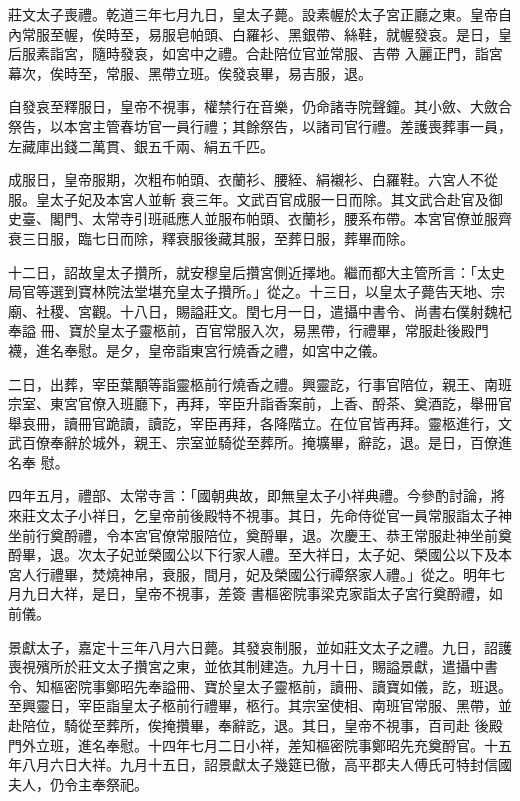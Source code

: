 \begin{pinyinscope}
 莊文太子喪禮。乾道三年七月九日，皇太子薨。設素幄於太子宮正廳之東。皇帝自內常服至幄，俟時至，易服皂帕頭、白羅衫、黑銀帶、絲鞋，就幄發哀。是日，皇后服素詣宮，隨時發哀，如宮中之禮。合赴陪位官並常服、吉帶
 入麗正門，詣宮幕次，俟時至，常服、黑帶立班。俟發哀畢，易吉服，退。



 自發哀至釋服日，皇帝不視事，權禁行在音樂，仍命諸寺院聲鐘。其小斂、大斂合祭告，以本宮主管春坊官一員行禮；其餘祭告，以諸司官行禮。差護喪葬事一員，左藏庫出錢二萬貫、銀五千兩、絹五千匹。



 成服日，皇帝服期，次粗布帕頭、衣蘭衫、腰絰、絹襯衫、白羅鞋。六宮人不從服。皇太子妃及本宮人並斬
 衰三年。文武百官成服一日而除。其文武合赴官及御史臺、閣門、太常寺引班祗應人並服布帕頭、衣蘭衫，腰系布帶。本宮官僚並服齊衰三日服，臨七日而除，釋衰服後藏其服，至葬日服，葬畢而除。



 十二日，詔故皇太子攢所，就安穆皇后攢宮側近擇地。繼而都大主管所言：「太史局官等選到寶林院法堂堪充皇太子攢所。」從之。十三日，以皇太子薨告天地、宗廟、社稷、宮觀。十八日，賜謚莊文。閏七月一日，遣攝中書令、尚書右僕射魏杞奉謚
 冊、寶於皇太子靈柩前，百官常服入次，易黑帶，行禮畢，常服赴後殿門襪，進名奉慰。是夕，皇帝詣東宮行燒香之禮，如宮中之儀。



 二日，出葬，宰臣葉顒等詣靈柩前行燒香之禮。興靈訖，行事官陪位，親王、南班宗室、東宮官僚入班廳下，再拜，宰臣升詣香案前，上香、酹茶、奠酒訖，舉冊官舉哀冊，讀冊官跪讀，讀訖，宰臣再拜，各降階立。在位官皆再拜。靈柩進行，文武百僚奉辭於城外，親王、宗室並騎從至葬所。掩壙畢，辭訖，退。是日，百僚進名奉
 慰。



 四年五月，禮部、太常寺言：「國朝典故，即無皇太子小祥典禮。今參酌討論，將來莊文太子小祥日，乞皇帝前後殿特不視事。其日，先命侍從官一員常服詣太子神坐前行奠酹禮，令本宮官僚常服陪位，奠酹畢，退。次慶王、恭王常服赴神坐前奠酹畢，退。次太子妃並榮國公以下行家人禮。至大祥日，太子妃、榮國公以下及本宮人行禮畢，焚燒神帛，衰服，間月，妃及榮國公行禫祭家人禮。」從之。明年七月九日大祥，是日，皇帝不視事，差簽
 書樞密院事梁克家詣太子宮行奠酹禮，如前儀。



 景獻太子，嘉定十三年八月六日薨。其發哀制服，並如莊文太子之禮。九日，詔護喪視殯所於莊文太子攢宮之東，並依其制建造。九月十日，賜謚景獻，遣攝中書令、知樞密院事鄭昭先奉謚冊、寶於皇太子靈柩前，讀冊、讀寶如儀，訖，班退。至興靈日，宰臣詣皇太子柩前行禮畢，柩行。其宗室使相、南班官常服、黑帶，並赴陪位，騎從至葬所，俟掩攢畢，奉辭訖，退。其日，皇帝不視事，百司赴
 後殿門外立班，進名奉慰。十四年七月二日小祥，差知樞密院事鄭昭先充奠酹官。十五年八月六日大祥。九月十五日，詔景獻太子幾筵已徹，高平郡夫人傅氏可特封信國夫人，仍令主奉祭祀。




\end{pinyinscope}
